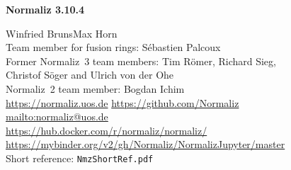 \documentclass[12pt,a4paper]{scrartcl}
\theoremstyle{definition}
\def\version{3.10.4}
\begin{document}
\vspace*{2cm}

\renewcommand{\indexname}{Index of keywords}

\centerline{\Large\textbf{Normaliz \version}}

\vspace*{1.5cm}

\begin{center}Winfried Bruns\qquad Max Horn\\[14pt]
	Team member for fusion rings: Sébastien Palcoux\\[14pt]
	Former Normaliz~3 team members: Tim R\"omer, Richard Sieg,\\ Christof S\"oger and Ulrich von der Ohe\\[14pt]
	Normaliz~2 team member: Bogdan Ichim\\[14pt]
	\url{https://normaliz.uos.de}\qquad\qquad\qquad
	\url{https://github.com/Normaliz}\\[14pt]
	\url{mailto:normaliz@uos.de}\\[14pt]
	\url{https://hub.docker.com/r/normaliz/normaliz/}\\[14pt]
	\url{https://mybinder.org/v2/gh/Normaliz/NormalizJupyter/master}\\[14pt]
	Short reference: \verb|NmzShortRef.pdf|
\end{center}



\tableofcontents










\newpage
\end{document}
